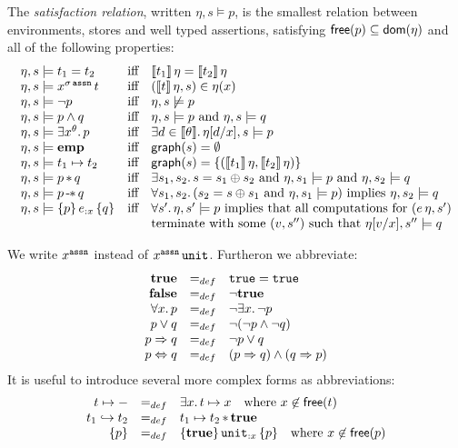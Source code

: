 \documentclass[12pt,a4paper]{article}
\newcommand{\emp}{\ensuremath{\mathbf{emp}}}
\begin{document}
\begin{definition}
  The {\em satisfaction relation}, written $\eta,s \models p$, is the smallest relation between 
  environments, stores and well typed assertions, satisfying $\mathsf{free}(p) \subseteq \mathsf{dom}(\eta)$ and all of the
  following properties:
  \[\begin{array}{lcl}
    \eta,s \models t_1 = t_2
    &\text{iff}& \semantic{t_1}\,\eta = \semantic{t_2}\,\eta \\
    \eta,s \models \app{x^{\tassn[\sigma]}}{t}
    &\text{iff}& (\semantic{t}\,\eta,s) \in \eta(x) \\
    \eta,s \models \neg p
    &\text{iff}& \eta,s \not\models p \\
    \eta,s \models p \wedge q
    &\text{iff}& \eta,s \models p \text{ and } \eta,s \models q \\
    \eta,s \models \exists x^\theta.\,p
    &\text{iff}& \exists d \in \semantic{\theta}.\,\eta[d/x],s \models p \\
    \eta,s \models \emp
    &\text{iff}& \grph{s} = \emptyset \\
    \eta,s \models t_1 \mapsto t_2
    &\text{iff}& \grph{s} = \{(\semantic{t_1}\,\eta,\semantic{t_2}\,\eta)\} \\
    \eta,s \models p \sepcon q
    &\text{iff}& \exists s_1,s_2.\,s=s_1 \oplus s_2 \text{ and } \eta,s_1 \models p \text{ and } \eta,s_2 \models q \\
    \eta,s \models p \sepimp q
    &\text{iff}& \forall s_1,s_2.\,(s_2 = s \oplus s_1 \text{ and } \eta,s_1 \models p) \text{ implies } \eta,s_2 \models q \\
    \eta,s \models \triplex{p}{e}{x}{q}
    &\text{iff}& \forall s'.\,\eta,s' \models p \text{ implies that all computations for } (e\,\eta,s') \\
    && \text{terminate with some $(v,s'')$ such that } \eta[v/x],s'' \models q
  \end{array}\]
\end{definition}

We write $x^{\tassn}$ instead of $\app{x^{\tassn}}{\unit}$.
Furtheron we abbreviate:
\[\begin{array}{rcl}
  \mathbf{true} &=_{def}& \mathtt{true} = \mathtt{true} \\
  \mathbf{false} &=_{def}& \neg \mathbf{true} \\
  \forall x.\,p &=_{def}& \neg \exists x.\,\neg p \\
  p \vee q &=_{def}& \neg (\neg p \wedge \neg q) \\
  p \Rightarrow q &=_{def}& \neg p \vee q \\
  p \Leftrightarrow q &=_{def}& (p \Rightarrow q) \wedge (q \Rightarrow p)
\end{array}\]
It is useful to introduce several more complex forms as abbreviations:
\[\begin{array}{rcl}
  t \mapsto - &=_{def}& \exists x.\,t \mapsto x \quad \text{where $x\not\in\mathsf{free}(t)$} \\
  t_1 \hookrightarrow t_2 &=_{def}& t_1 \mapsto t_2 \operatorname{\ast} \mathbf{true} \\
  \{p\} &=_{def}& \{\mathbf{true}\}\,{\mathtt{unit}}_{:{x}}\,\{p\} \quad \text{where $x\not\in\mathsf{free}(p)$}
\end{array}\]
\end{document}
